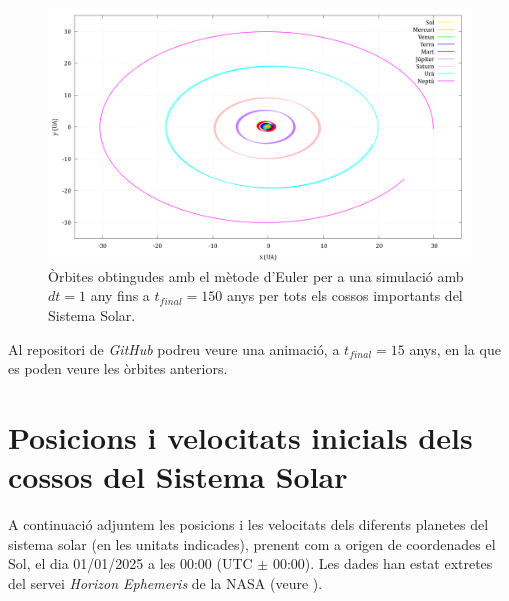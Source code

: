 \documentclass[10pt, twoside, a4paper]{article}
\begin{document}
\begin{figure}[h]
    \centering
    \includegraphics[width=1.0\linewidth]{../sist_solar/orbites_euler_TOTS_150_d1dia.png}
    \caption{Òrbites obtingudes amb el mètode d'Euler per a una simulació amb $dt=1$ any fins a $t_{final}=150$ anys per tots els cossos importants del Sistema Solar.}
    \label{fig:an1}
\end{figure}

Al repositori de \textit{GitHub} podreu veure una animació, a $t_{final}=15$ anys, en la que es poden veure les òrbites anteriors.

\section{Posicions i velocitats inicials dels cossos del Sistema Solar}
\label{an:c}
A continuació adjuntem les posicions i les velocitats dels diferents planetes del sistema solar (en les unitats indicades), prenent com a origen de coordenades el Sol, el dia 01/01/2025 a les 00:00 (UTC $\pm$ 00:00). Les dades han estat extretes del servei \textit{Horizon Ephemeris} de la NASA (veure \cite{ref3}).
\end{document}

